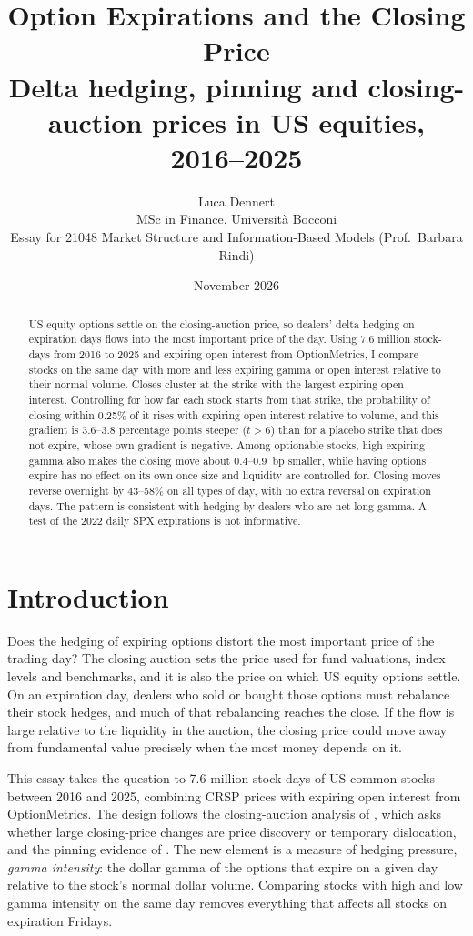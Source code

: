 \documentclass[11pt,a4paper]{article}
\title{\textbf{Option Expirations and the Closing Price}\\[4pt]
\large Delta hedging, pinning and closing-auction prices in US equities, 2016--2025}
\author{Luca Dennert\\[2pt]
\small MSc in Finance, Universit\`a Bocconi\\
\small Essay for 21048 Market Structure and Information-Based Models (Prof.\ Barbara Rindi)}
\date{November 2026}
\begin{document}
\maketitle

\begin{abstract}
\noindent US equity options settle on the closing-auction price, so dealers' delta hedging on expiration days flows into the most important price of the day. Using 7.6 million stock-days from 2016 to 2025 and expiring open interest from OptionMetrics, I compare stocks on the same day with more and less expiring gamma or open interest relative to their normal volume. Closes cluster at the strike with the largest expiring open interest. Controlling for how far each stock starts from that strike, the probability of closing within 0.25\% of it rises with expiring open interest relative to volume, and this gradient is 3.6--3.8 percentage points steeper ($t>6$) than for a placebo strike that does not expire, whose own gradient is negative. Among optionable stocks, high expiring gamma also makes the closing move about 0.4--0.9~bp smaller, while having options expire has no effect on its own once size and liquidity are controlled for. Closing moves reverse overnight by 43--58\% on all types of day, with no extra reversal on expiration days. The pattern is consistent with hedging by dealers who are net long gamma. A test of the 2022 daily SPX expirations is not informative.
\end{abstract}

\section{Introduction}

Does the hedging of expiring options distort the most important price of the trading day? The closing auction sets the price used for fund valuations, index levels and benchmarks, and it is also the price on which US equity options settle. On an expiration day, dealers who sold or bought those options must rebalance their stock hedges, and much of that rebalancing reaches the close. If the flow is large relative to the liquidity in the auction, the closing price could move away from fundamental value precisely when the most money depends on it.

This essay takes the question to 7.6 million stock-days of US common stocks between 2016 and 2025, combining CRSP prices with expiring open interest from OptionMetrics. The design follows the closing-auction analysis of \citet{ComertonFordeRindi2022}, which asks whether large closing-price changes are price discovery or temporary dislocation, and the pinning evidence of \citet{NiPearsonPoteshman2005}. The new element is a measure of hedging pressure, \emph{gamma intensity}: the dollar gamma of the options that expire on a given day relative to the stock's normal dollar volume. Comparing stocks with high and low gamma intensity on the same day removes everything that affects all stocks on expiration Fridays.
\end{document}
